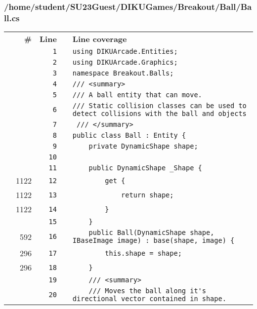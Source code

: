 \documentclass[a4paper,landscape,10pt]{article}
\begin{document}
\subsubsection{/home/student/SU23Guest/DIKUGames/Breakout/Ball/Ball.cs}
\begin{longtable}[l]{lrrll}
\textbf{} & \textbf{\#} & \textbf{Line} & \textbf{} & \textbf{Line coverage}\\
\cellcolor{gray} &  & \verb~1~ & & \verb~using DIKUArcade.Entities;~\\
\cellcolor{gray} &  & \verb~2~ & & \verb~using DIKUArcade.Graphics;~\\
\cellcolor{gray} &  & \verb~3~ & & \verb~namespace Breakout.Balls;~\\
\cellcolor{gray} &  & \verb~4~ & & \verb~/// <summary>~\\
\cellcolor{gray} &  & \verb~5~ & & \verb~/// A ball entity that can move.~\\
\cellcolor{gray} &  & \verb~6~ & & \verb~/// Static collision classes can be used to detect collisions with the ball and objects~\\
\cellcolor{gray} &  & \verb~7~ & & \verb~ /// </summary>~\\
\cellcolor{gray} &  & \verb~8~ & & \verb~public class Ball : Entity {~\\
\cellcolor{gray} &  & \verb~9~ & & \verb~    private DynamicShape shape;~\\
\cellcolor{gray} &  & \verb~10~ & & \verb~~\\
\cellcolor{gray} &  & \verb~11~ & & \verb~    public DynamicShape _Shape {~\\
\cellcolor{green} & 1122 & \verb~12~ & & \verb~        get {~\\
\cellcolor{green} & 1122 & \verb~13~ & & \verb~            return shape;~\\
\cellcolor{green} & 1122 & \verb~14~ & & \verb~        }~\\
\cellcolor{gray} &  & \verb~15~ & & \verb~    }~\\
\cellcolor{green} & 592 & \verb~16~ & & \verb~    public Ball(DynamicShape shape, IBaseImage image) : base(shape, image) {~\\
\cellcolor{green} & 296 & \verb~17~ & & \verb~        this.shape = shape;~\\
\cellcolor{green} & 296 & \verb~18~ & & \verb~    }~\\
\cellcolor{gray} &  & \verb~19~ & & \verb~    /// <summary>~\\
\cellcolor{gray} &  & \verb~20~ & & \verb~    /// Moves the ball along it's directional vector contained in shape.~\\

\end{longtable}
\end{document}
